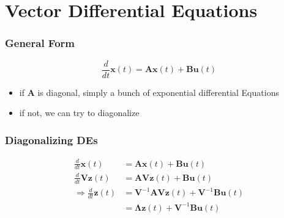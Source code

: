 \documentclass[aspectratio=169]{beamer}
\newcommand{\diff}[1]{\frac{d}{d #1}}
\begin{document}
\section{Vector Differential Equations}

\begin{frame}
    \frametitle{General Form}

    \begin{equation}
        \diff{t} \bm{x}(t) = \bm{Ax}(t) + \bm{Bu}(t)
    \end{equation}
    \begin{itemize}
        \item if \(\bm{A}\) is diagonal, simply a bunch of exponential differential Equations
        \item if not, we can try to diagonalize
    \end{itemize}
\end{frame}

\begin{frame}
    \frametitle{Diagonalizing DEs}

    \begin{align}
        \diff{t} \bm{x}(t) &= \bm{Ax}(t) + \bm{Bu}(t) \\
        \diff{t} \bm{Vz}(t) &= \bm{AVz}(t) + \bm{Bu}(t) \\
        \Rightarrow \diff{t} \bm{z}(t) &= \bm{V}^{-1} \bm{AVz}(t) + \bm{V}^{-1} \bm{Bu}(t) \\
        &= \bm{\Lambda z}(t) + \bm{V}^{-1} \bm{Bu}(t)
    \end{align}
\end{frame}



\end{document}

